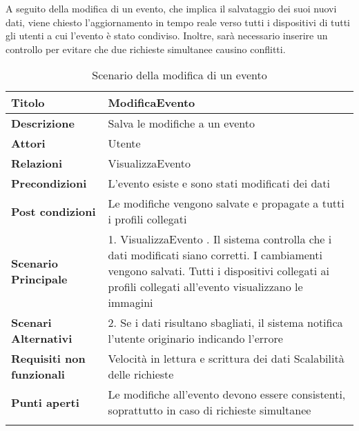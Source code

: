 A seguito della modifica di un evento,
che implica il salvataggio dei suoi nuovi dati,
viene chiesto l'aggiornamento in tempo reale verso
tutti i dispositivi di tutti gli utenti a cui l'evento è stato condiviso.
Inoltre, sarà necessario inserire un controllo per evitare
che due richieste simultanee causino conflitti.\\

\begin{longtable} {|P{4.5cm}|P{11cm}|}
    \hline
    \textbf{Titolo}                   & ModificaEvento                                                                               \\
    \hline
    \textbf{Descrizione}              & Salva le modifiche a un evento                                                               \\
    \hline
    \textbf{Attori}                   & Utente                                                                                       \\
    \hline
    \textbf{Relazioni}                & VisualizzaEvento                                                                             \\
    \hline
    \textbf{Precondizioni}            & L'evento esiste e sono stati modificati dei dati                                             \\
    \hline
    \textbf{Post condizioni}          & Le modifiche vengono salvate e propagate a tutti i profili collegati                         \\
    \hline
    \textbf{Scenario Principale}      & 1. VisualizzaEvento . Il sistema controlla che i dati modificati siano corretti. I cambiamenti vengono salvati. Tutti i dispositivi collegati ai profili collegati all'evento visualizzano le immagini                                        \\
    \hline
    \textbf{Scenari Alternativi}      & 2. Se i dati risultano sbagliati, il sistema notifica l'utente originario indicando l'errore \\
    \hline
    \textbf{Requisiti non funzionali} & Velocità in lettura e scrittura dei dati \newline
    Scalabilità delle richieste                                                                                                      \\
    \hline
    \textbf{Punti aperti}             & Le modifiche all'evento devono essere consistenti, \newline
    soprattutto in caso di richieste simultanee                                                                                      \\
    \hline
    \caption{Scenario della modifica di un evento}
\end{longtable}

